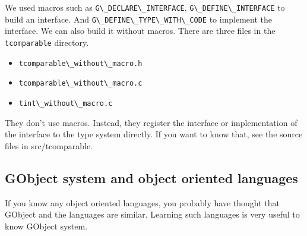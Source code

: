 We used macros such as \passthrough{\lstinline!G\_DECLARE\_INTERFACE!},
\passthrough{\lstinline!G\_DEFINE\_INTERFACE!} to build an interface.
And \passthrough{\lstinline!G\_DEFINE\_TYPE\_WITH\_CODE!} to implement
the interface. We can also build it without macros. There are three
files in the \passthrough{\lstinline!tcomparable!} directory.

\begin{itemize}
\tightlist
\item
  \passthrough{\lstinline!tcomparable\_without\_macro.h!}
\item
  \passthrough{\lstinline!tcomparable\_without\_macro.c!}
\item
  \passthrough{\lstinline!tint\_without\_macro.c!}
\end{itemize}

They don't use macros. Instead, they register the interface or
implementation of the interface to the type system directly. If you want
to know that, see the source files in src/tcomparable.

\subsection{GObject system and object oriented
languages}\label{gobject-system-and-object-oriented-languages}

If you know any object oriented languages, you probably have thought
that GObject and the languages are similar. Learning such languages is
very useful to know GObject system.

